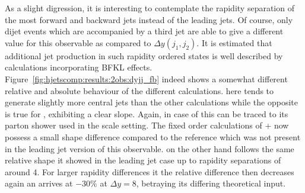 As a slight digression, it is interesting to contemplate the rapidity 
separation of the most forward and backward jets instead of the 
leading jets. Of course, only dijet events which are accompanied by 
a third jet are able to give a different value for this observable 
as compared to $\Delta y(j_1,j_2)$. It is estimated that additional 
jet production in such rapidity ordered states is well described 
by calculations incorporating BFKL effects. 
Figure~\ref{fig:hjetscomp:results:2obs:dyjj_fb} indeed shows a 
somewhat different relative and absolute behaviour of the different 
calculations. \Powheg \NNLOPS here tends to generate slightly more 
central jets than the other calculations while the opposite is true 
for \Sherpa \MEPSatNLO, exhibiting a clear slope. Again, in case 
of \Sherpa \MEPSatNLO this can be traced to its parton shower used 
in the scale setting. The fixed order calculations of \GoSam{}+\Sherpa 
now possess a small shape difference compared to the reference which 
was not present in the leading jet version of this observable. \Hej 
on the other hand follows the same relative shape it showed in the 
leading jet case up to rapidity separations of around 4. For larger 
rapidity differences it the relative difference then decreases again 
an arrives at $-30\%$ at $\Delta y=8$, betraying its differing 
theoretical input.


